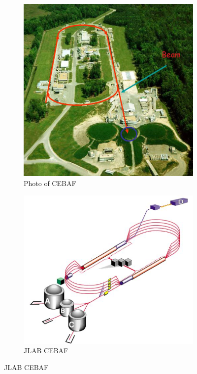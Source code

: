 \begin{figure}
     \centering
     \begin{subfigure}[b]{0.45\textwidth}
         \centering
         \includegraphics[width=\textwidth]{images/chap3/JLab_cebaf_photo.png}
         \caption{Photo of CEBAF}
         \label{Photo of CEBAF}
     \end{subfigure}
     \hfill
     \begin{subfigure}[b]{0.45\textwidth}
         \centering
         \includegraphics[width=\textwidth]{images/chap3/JLab_cebaf.png}
         \caption{JLAB CEBAF}
         \label{JLAB CEBAF}
     \end{subfigure}
\end{figure}

